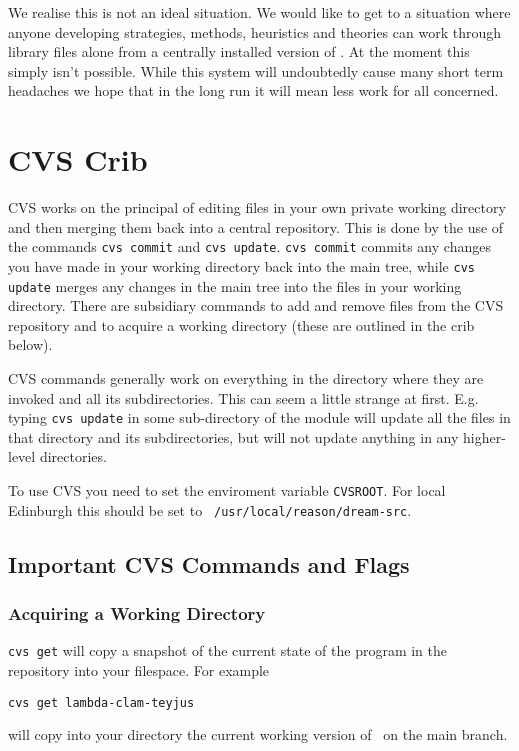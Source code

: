 We realise this is not an ideal situation.  We would like to get to a
situation where anyone developing strategies, methods, heuristics and
theories can work through library files alone from a centrally
installed version of \lclam.  At the moment this simply isn't
possible.  While this system will undoubtedly cause many short term
headaches we hope that in the long run it will mean less work for all
concerned.


\section{CVS Crib}

CVS works on the principal of editing files in your own private
    working directory and then merging them back into a central
    repository.  This is done by the use of the commands {\tt cvs
      commit} and {\tt cvs update}.  {\tt cvs
      commit} commits any changes you have made in your working
    directory back into the main tree, while {\tt cvs update}
    merges any changes in the main tree into the files in your working 
    directory.  There are subsidiary commands to add and remove files
    from the CVS repository and to acquire a working directory (these
    are outlined in the crib below).


CVS commands generally work on everything in the directory where
      they are invoked and all its subdirectories.  This can seem a
      little strange at first.  E.g. typing {\tt cvs update} in 
      some sub-directory of the module will update all the files in
      that directory and its subdirectories, but will not update
      anything in any higher-level directories. 

To use CVS you need to set the enviroment variable \verb+CVSROOT+.
For local Edinburgh this should be set to {\tt
  /usr/local/reason/dream-src}.


\subsection{Important CVS Commands and Flags}

\subsubsection{Acquiring a Working Directory}
{\tt cvs get} will copy a snapshot 
    of the current state of the program in the repository into your
    filespace.  For example
\begin{verbatim}
cvs get lambda-clam-teyjus
\end{verbatim}
 will copy
    into your directory the current working version of \lclam\ on
    the main branch.

